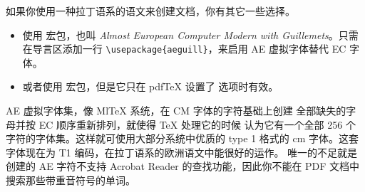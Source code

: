 
如果你使用一种拉丁语系的语文来创建文档，你有其它一些选择。
\begin{itemize}
\item 使用  宏包，也叫 \emph{Almost European Computer Modern with
Guillemets}。只需在导言区添加一行 \verb+\usepackage{aeguill}+，来启用 AE 虚拟字体替代 EC 字体。
\item 或者使用  宏包，但是它只在 pdf\TeX{} 设置了  选项时有效。
\end{itemize}


AE 虚拟字体集，像 {Ml\TeX} 系统，在 CM 字体的字符基础上创建
全部缺失的字母并按 EC 顺序重新排列，就使得 \TeX{} 处理它的时候
认为它有一个全部 256 个字符的字体集。这样就可使用大部分系统中优质的 type
1 格式的 cm 字体。这套字体现在为 T1 编码，在拉丁语系的欧洲语文中能很好的运作。
唯一的不足就是创建的 AE 字符不支持 Acrobat
Reader 的查找功能，因此你不能在 PDF 文档中搜索那些带重音符号的单词。


